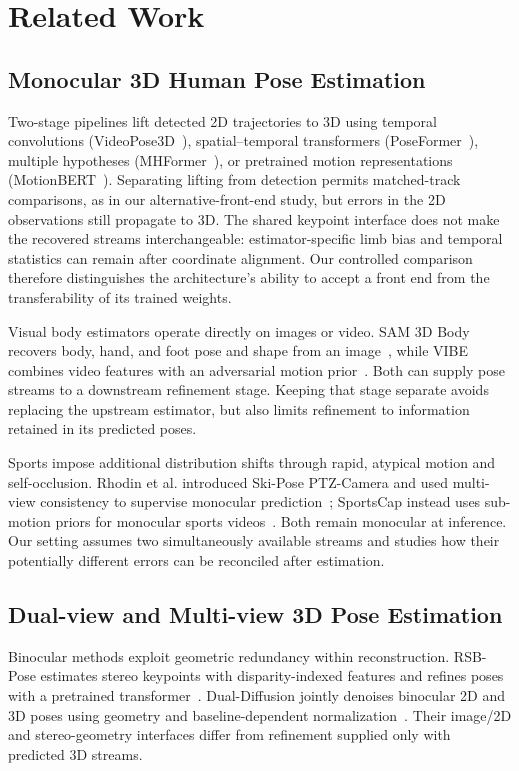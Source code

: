 \documentclass[preprint,12pt]{elsarticle}
\begin{document}
\section{Related Work}
\label{sec:related_work}

\subsection{Monocular 3D Human Pose Estimation}
Two-stage pipelines lift detected 2D trajectories to 3D using temporal convolutions (VideoPose3D~\cite{pavllo2019videopose3d}), spatial--temporal transformers (PoseFormer~\cite{zheng2021poseformer}), multiple hypotheses (MHFormer~\cite{li2022mhformer}), or pretrained motion representations (MotionBERT~\cite{zhu2023motionbert}). Separating lifting from detection permits matched-track comparisons, as in our alternative-front-end study, but errors in the 2D observations still propagate to 3D. The shared keypoint interface does not make the recovered streams interchangeable: estimator-specific limb bias and temporal statistics can remain after coordinate alignment. Our controlled comparison therefore distinguishes the architecture's ability to accept a front end from the transferability of its trained weights.

Visual body estimators operate directly on images or video. SAM 3D Body recovers body, hand, and foot pose and shape from an image~\cite{yang2026sam}, while VIBE combines video features with an adversarial motion prior~\cite{kocabas2020vibe}. Both can supply pose streams to a downstream refinement stage. Keeping that stage separate avoids replacing the upstream estimator, but also limits refinement to information retained in its predicted poses.

Sports impose additional distribution shifts through rapid, atypical motion and self-occlusion. Rhodin et al. introduced Ski-Pose PTZ-Camera and used multi-view consistency to supervise monocular prediction~\cite{rhodin2018learning}; SportsCap instead uses sub-motion priors for monocular sports videos~\cite{chen2021sportscap}. Both remain monocular at inference. Our setting assumes two simultaneously available streams and studies how their potentially different errors can be reconciled after estimation.

\subsection{Dual-view and Multi-view 3D Pose Estimation}
Binocular methods exploit geometric redundancy within reconstruction. RSB-Pose estimates stereo keypoints with disparity-indexed features and refines poses with a pretrained transformer~\cite{wan2025rsb}. Dual-Diffusion jointly denoises binocular 2D and 3D poses using geometry and baseline-dependent normalization~\cite{wan2024dualdiffusion}. Their image/2D and stereo-geometry interfaces differ from refinement supplied only with predicted 3D streams.
\end{document}

